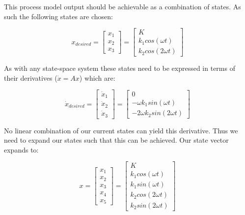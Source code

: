 This process model output should be achievable as a combination of states. As such the following states are chosen:

\begin{equation} \label{eq:consump_x}
	x_{desired} =  \begin{bmatrix}
		x_1 \\
		x_2 \\
		x_3
	\end{bmatrix}
	=
	\begin{bmatrix}
		K \\
		k_1 cos(\omega t) \\
		k_2 cos(2\omega t)
	\end{bmatrix}
\end{equation}

As with any state-space system these states need to be expressed in terms of their derivatives ($\dot x = Ax$) which are:

\begin{equation} \label{eq:consump_x_deriv_s}
	\dot x_{desired}  = \begin{bmatrix}
		\dot x_1 \\
		\dot x_2 \\
		\dot x_3
	\end{bmatrix}
	=
	\begin{bmatrix}
		0 \\
		- \omega k_1 sin(\omega t) \\
		- 2\omega k_2 sin(2\omega t)
	\end{bmatrix}
\end{equation}

No linear combination of our current states can yield this derivative. Thus we need to expand our states such that this can be achieved. Our state vector expands to:

\begin{equation} \label{eq:consump_x_l}
		x =  \begin{bmatrix}
			x_1 \\
			x_2 \\
			x_3 \\
			x_4 \\
			x_5
		\end{bmatrix}
		=
		 \begin{bmatrix}
		K \\
		k_1 cos(\omega t) \\
		k_1 sin(\omega t) \\
		k_2 cos(2 \omega t) \\
		k_2 sin(2 \omega t) 
	\end{bmatrix}
\end{equation}

